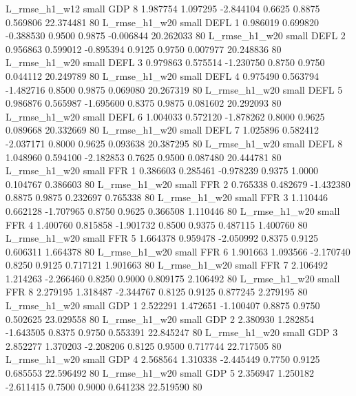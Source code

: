  L_rmse_h1_w12      small      GDP                 8 1.987754 1.097295 -2.844104 0.6625 0.8875  0.569806   22.374481 80
 L_rmse_h1_w20      small     DEFL                 1 0.986019 0.699820 -0.388530 0.9500 0.9875 -0.006844   20.262033 80
 L_rmse_h1_w20      small     DEFL                 2 0.956863 0.599012 -0.895394 0.9125 0.9750  0.007977   20.248836 80
 L_rmse_h1_w20      small     DEFL                 3 0.979863 0.575514 -1.230750 0.8750 0.9750  0.044112   20.249789 80
 L_rmse_h1_w20      small     DEFL                 4 0.975490 0.563794 -1.482716 0.8500 0.9875  0.069080   20.267319 80
 L_rmse_h1_w20      small     DEFL                 5 0.986876 0.565987 -1.695600 0.8375 0.9875  0.081602   20.292093 80
 L_rmse_h1_w20      small     DEFL                 6 1.004033 0.572120 -1.878262 0.8000 0.9625  0.089668   20.332669 80
 L_rmse_h1_w20      small     DEFL                 7 1.025896 0.582412 -2.037171 0.8000 0.9625  0.093638   20.387295 80
 L_rmse_h1_w20      small     DEFL                 8 1.048960 0.594100 -2.182853 0.7625 0.9500  0.087480   20.444781 80
 L_rmse_h1_w20      small      FFR                 1 0.386603 0.285461 -0.978239 0.9375 1.0000  0.104767    0.386603 80
 L_rmse_h1_w20      small      FFR                 2 0.765338 0.482679 -1.432380 0.8875 0.9875  0.232697    0.765338 80
 L_rmse_h1_w20      small      FFR                 3 1.110446 0.662128 -1.707965 0.8750 0.9625  0.366508    1.110446 80
 L_rmse_h1_w20      small      FFR                 4 1.400760 0.815858 -1.901732 0.8500 0.9375  0.487115    1.400760 80
 L_rmse_h1_w20      small      FFR                 5 1.664378 0.959478 -2.050992 0.8375 0.9125  0.606311    1.664378 80
 L_rmse_h1_w20      small      FFR                 6 1.901663 1.093566 -2.170740 0.8250 0.9125  0.717121    1.901663 80
 L_rmse_h1_w20      small      FFR                 7 2.106492 1.214263 -2.266460 0.8250 0.9000  0.809175    2.106492 80
 L_rmse_h1_w20      small      FFR                 8 2.279195 1.318487 -2.344767 0.8125 0.9125  0.877245    2.279195 80
 L_rmse_h1_w20      small      GDP                 1 2.522291 1.472651 -1.100407 0.8875 0.9750  0.502625   23.029558 80
 L_rmse_h1_w20      small      GDP                 2 2.380930 1.282854 -1.643505 0.8375 0.9750  0.553391   22.845247 80
 L_rmse_h1_w20      small      GDP                 3 2.852277 1.370203 -2.208206 0.8125 0.9500  0.717744   22.717505 80
 L_rmse_h1_w20      small      GDP                 4 2.568564 1.310338 -2.445449 0.7750 0.9125  0.685553   22.596492 80
 L_rmse_h1_w20      small      GDP                 5 2.356947 1.250182 -2.611415 0.7500 0.9000  0.641238   22.519590 80
